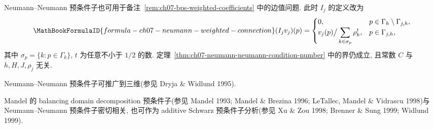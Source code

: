 \begin{Remark}
\label{rem:ch07-neumann-weighted-coefficients}
Neumann--Neumann 预条件子也可用于备注~\ref{rem:ch07-bps-weighted-coefficients} 中的边值问题. 此时 $I_j$ 的定义改为
\[
\MathBookFormulaID{formula-ch07-neumann-weighted-connection}
(I_jv_j)(p)=
\begin{cases}
0,&p\in\Gamma_h\setminus\Gamma_{j,h},\\
v_j(p)\big/\displaystyle\sum_{k\in\sigma_p}\rho_k^t,&p\in\Gamma_{j,h},
\end{cases}
\]
其中 $\sigma_p=\{k:p\in\Gamma_k\}$, $t$ 为任意不小于 $1/2$ 的数. 定理~\ref{thm:ch07-neumann-neumann-condition-number} 中的界仍成立, 且常数 $C$ 与 $h,H,J,\rho_j$ 无关.
\end{Remark}

\begin{Remark}
\label{rem:ch07-neumann-three-dimensional}
Neumann--Neumann 预条件子可推广到三维(参见 Dryja \& Widlund 1995).
\end{Remark}

\begin{Remark}
\label{rem:ch07-balancing-domain-decomposition}
Mandel 的 balancing domain decomposition 预条件子(参见 Mandel 1993; Mandel \& Brezina 1996; LeTallec, Mandel \& Vidrascu 1998)与 Neumann--Neumann 预条件子密切相关, 也可作为 additive Schwarz 预条件子分析(参见 Xu \& Zou 1998; Brenner \& Sung 1999; Widlund 1999).
\end{Remark}
